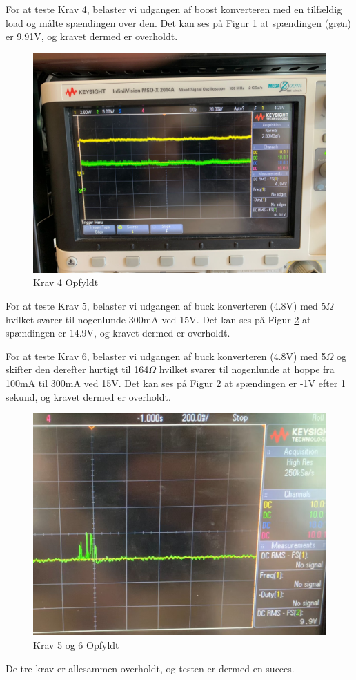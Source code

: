 \documentclass[../main.tex]{subfiles}
\begin{document}
For at teste Krav 4, belaster vi udgangen af boost konverteren med en tilfældig load og målte spændingen over den. Det kan ses på Figur \ref{fig: Krav 4 Opfyldt} at spændingen (grøn) er 9.91V, og kravet dermed er overholdt.
\begin{figure}[H]
      \includegraphics[width=\textwidth]{Dokumentation/Pictures/Krav4.jpg}
     \caption{Krav 4 Opfyldt}
     \label{fig: Krav 4 Opfyldt}
     \end{figure}

For at teste Krav 5, belaster vi udgangen af buck konverteren (4.8V) med 5$\Omega$ hvilket svarer til nogenlunde 300mA ved 15V. Det kan ses på Figur \ref{fig: Krav 5 og 6 Opfyldt} at spændingen er 14.9V, og kravet dermed er overholdt.

For at teste Krav 6, belaster vi udgangen af buck konverteren (4.8V) med 5$\Omega$ og skifter den derefter hurtigt til 164$\Omega$ hvilket svarer til nogenlunde at hoppe fra 100mA til 300mA ved 15V. Det kan ses på Figur \ref{fig: Krav 5 og 6 Opfyldt} at spændingen er -1V efter 1 sekund, og kravet dermed er overholdt.

\begin{figure}[H]
      \includegraphics[width=\textwidth]{Dokumentation/Pictures/Krav5og6.jpg}
     \caption{Krav 5 og 6 Opfyldt}
     \label{fig: Krav 5 og 6 Opfyldt}
     \end{figure}

De tre krav er allesammen overholdt, og testen er dermed en succes. 
\end{document}
